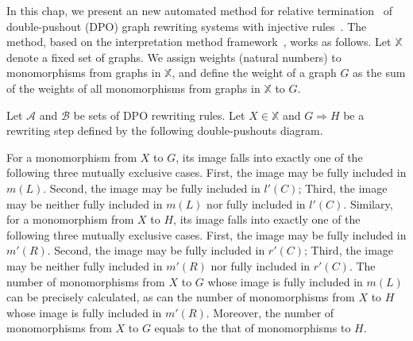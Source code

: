 
In this chap, we present an new automated method for relative termination~\cite{geser1990relative} of double-pushout (DPO) graph rewriting systems with injective rules~\cite{corradini1997algebraic,habel2001double,konig2018atutorial}. The method, based on the interpretation method framework~\cite{nipkow1998term}, works as follows. Let \( \mathbb{X} \) denote a fixed set of graphs. We assign weights (natural numbers) to monomorphisms from graphs in \( \mathbb{X} \), and define the weight of a graph $G$ as the sum of the weights of all monomorphisms from graphs in \( \mathbb{X} \) to $G$. 

Let $\mathcal{A}$ and $\mathcal{B}$ be sets of DPO rewriting rules. Let $X \in \mathbb{X}$ and $G \Rightarrow H$ be a rewriting step defined by the following double-pushouts diagram.
\begin{center}
\end{center}

For a monomorphism from $X$ to $G$, its image falls into exactly one of the following three mutually exclusive cases. First, the image may be fully included in $m(L)$. Second, the image may be fully included in $l'(C)$; Third, the image may be neither fully included in $m(L)$ nor fully included in $l'(C)$. Similary, for a monomorphism from $X$ to $H$, its image falls into exactly one of the following three mutually exclusive cases. First, the image may be fully included in $m'(R)$. Second, the image may be fully included in $r'(C)$; Third, the image may be neither fully included in $m'(R)$ nor fully included in $r'(C)$. The number of monomorphisms from $X$ to $G$ whose image is fully included in $m(L)$ can be precisely calculated, as can the number of monomorphisms from $X$ to $H$ whose image is fully included in $m'(R)$. Moreover, the number of monomorphisms from $X$ to $G$ equals to the that of monomorphisms to $H$. 

